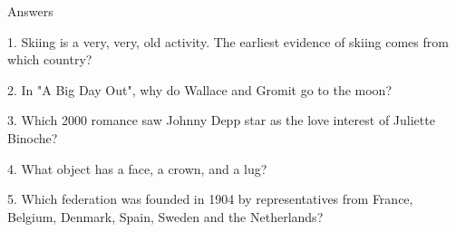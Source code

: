 \begin{frame}

\end{frame}
\begin{frame}
\begin{center}
\Huge
Answers
\end{center}
\end{frame}
\begin{frame}
\begin{center}
\Large
1. Skiing is a very, very, old activity. The earliest evidence of skiing comes from which country?
\\
\end{center}
\end{frame}
\begin{frame}
\begin{center}
\Large
2. In "A Big Day Out", why do Wallace and Gromit go to the moon?
\\
\end{center}
\end{frame}
\begin{frame}
\begin{center}
\Large
3. Which 2000 romance saw Johnny Depp star as the love interest of Juliette Binoche?
\\
\end{center}
\end{frame}
\begin{frame}
\begin{center}
\Large
4. What object has a face, a crown, and a lug?
\\
\end{center}
\end{frame}
\begin{frame}
\begin{center}
\Large
5. Which federation was founded in 1904 by representatives from France, Belgium, Denmark, Spain, Sweden and the Netherlands?
\\
\end{center}
\end{frame}
